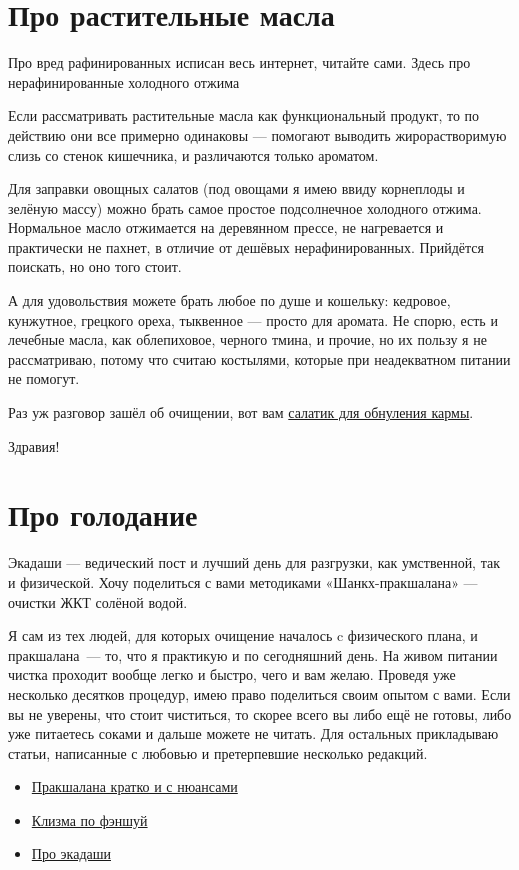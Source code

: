 \section{Про растительные масла}

Про вред рафинированных исписан весь интернет, читайте сами. Здесь про нерафинированные холодного отжима

Если рассматривать растительные масла как функциональный продукт, то по действию они все примерно одинаковы — помогают выводить жирорастворимую слизь со стенок кишечника, и различаются только ароматом. 

Для заправки овощных салатов (под овощами я имею ввиду корнеплоды и зелёную массу) можно брать самое простое подсолнечное холодного отжима. Нормальное масло отжимается на деревянном прессе, не нагревается и практически не пахнет, в отличие от дешёвых нерафинированных. Прийдётся поискать, но оно того стоит.

А для удовольствия можете брать любое по душе и кошельку: кедровое, кунжутное, грецкого ореха, тыквенное — просто для аромата.
Не спорю, есть и лечебные масла, как облепиховое, черного тмина, и прочие, но их пользу я не рассматриваю, потому что считаю костылями, которые при неадекватном питании не помогут.

Раз уж разговор зашёл об очищении, вот вам \hyperref[cleanSalad]{салатик для обнуления кармы}.

Здравия!


\section{Про голодание}
Экадаши — ведический пост и лучший день для разгрузки, как умственной, так и физической. Хочу поделиться с вами методиками «Шанкх-пракшалана» — очистки ЖКТ солёной водой.

Я сам из тех людей, для которых очищение началось c физического плана, и пракшалана~--- то, что я практикую и по сегодняшний день. На живом питании чистка проходит вообще легко и быстро, чего и вам желаю. Проведя уже несколько десятков процедур, имею право поделиться своим опытом с вами. Если вы не уверены, что стоит чиститься, то скорее всего вы либо ещё не готовы, либо уже питаетесь соками и дальше можете не читать. Для остальных прикладываю статьи, написанные с любовью и претерпевшие несколько редакций.
\begin{itemize}
    \item \hyperref[fasting1]{Пракшалана кратко и с нюансами}
    \item \hyperref[fasting2]{Клизма по фэншуй}
    \item \hyperref[fasting3]{Про экадаши}
\end{itemize}

